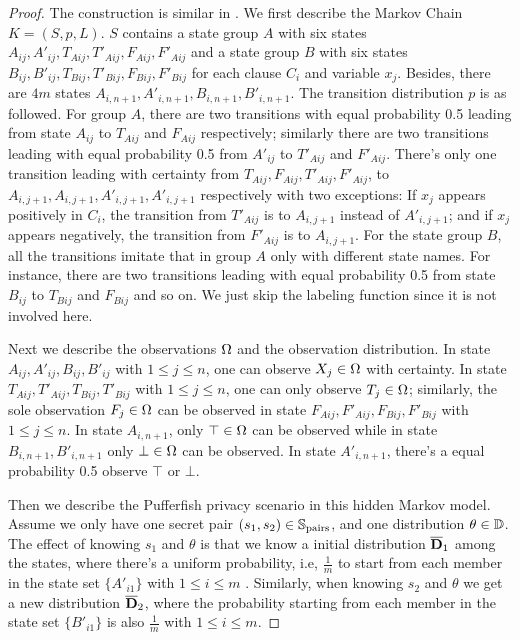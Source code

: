 \begin{proof}
  The construction is similar in \cite{}. We first describe the Markov Chain $K =
  (S, p, L)$. $S$ contains a state group $A$ with six states $A_{ij},A'_{ij},T_{A ij},T'_{Aij},F_{Aij},F'_{Aij}$ and
  a state group $B$ with six states $B_{ij},B'_{ij},T_{Bij},T'_{Bij},F_{Bij},F'_{Bij}$
  for each clause $C_i$ and variable $x_j$. Besides, there are $4m$ states $A_{i,n+1},A'_{i,n+1},B_{i,n+1},B'_{i,n+1}$.
  The transition distribution $p$ is as followed. For group $A$, there are two transitions with equal probability 0.5 leading from
  state $A_{ij}$ to $T_{Aij}$ and $F_{Aij}$ respectively; similarly there are two transitions leading with equal probability 0.5
  from $A'_{ij}$ to $T'_{Aij}$ and $F'_{Aij}$. There's only one transition leading with certainty from $T_{Aij},F_{Aij},T'_{Aij},F'_{Aij}$,
  to $A_{i,j+1},A_{i,j+1},A'_{i,j+1},A'_{i,j+1}$ respectively with two exceptions: If $x_j$ appears positively in $C_i$,
  the transition from $T'_{Aij}$ is to $A_{i,j+1}$ instead of $A'_{i,j+1}$; and if $x_j$ appears negatively, the transition from
  $F'_{Aij}$ is to $A_{i,j+1}$. For the state group $B$, all the transitions imitate that in group $A$ only with different state names.
  For instance, there are two transitions leading with equal probability 0.5 from state $B_{ij}$ to $T_{Bij}$ and $F_{Bij}$ and so on.
  We just skip the labeling function since it is not involved here.

  Next we describe the observations $\Omega$ and the observation distribution. In state
  $A_{ij},A'_{ij},B_{ij},B'_{ij}$ with $1\leq j \leq n$, one can observe $X_j \in \Omega$ with certainty.
  In state $T_{Aij},T'_{Aij},T_{Bij},T'_{Bij}$ with $1\leq j \leq n$, one can only observe $T_j \in \Omega$;
  similarly, the sole observation $F_j \in \Omega$ can be observed in state $F_{Aij},F'_{Aij},F_{Bij},F'_{Bij}$ with $1\leq j \leq n$.
  In state $A_{i,n+1}$, only $\top \in \Omega$ can be observed while in state $B_{i,n+1},B'_{i,n+1}$ only
  $\bot \in \Omega$ can be observed. In state $A'_{i,n+1}$, there's a equal probability 0.5 observe $\top$ or $\bot$.

  Then we describe the Pufferfish privacy scenario in this hidden Markov model. Assume we only have one secret pair
  $(s_1, s_2)\in \mathbb{S}_{\textmd{pairs}}$, and one distribution $\theta \in \mathbb{D}$. The effect of knowing $s_1$ and $\theta$
  is that we know a initial distribution $\overline{\mathbf{D}}_1$ among the states, where
  there's a uniform probability, i.e, $\frac{1}{m}$ to start from each member in the state set $\{A'_{i1}\}$ with $1 \leq i \leq m$ .
  Similarly, when knowing $s_2$ and $\theta$ we get a new distribution $\overline{\mathbf{D}}_2$, where
  the probability starting from each member in the state set $\{B'_{i1}\}$ is also $\frac{1}{m}$ with $1 \leq i \leq m$.


\end{proof}
